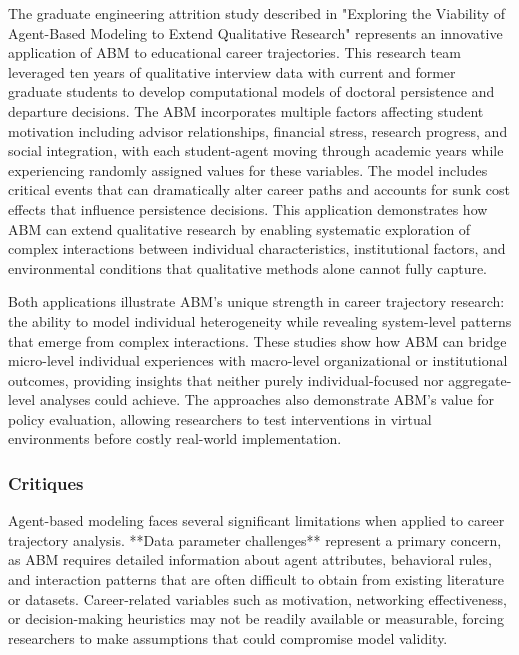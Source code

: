 \documentclass[main.tex]{subfiles}
\begin{document}
The graduate engineering attrition study described in "Exploring the Viability of Agent-Based Modeling to Extend Qualitative Research" represents an innovative application of ABM to educational career trajectories\parencite{graduate_attrition}. This research team leveraged ten years of qualitative interview data with current and former graduate students to develop computational models of doctoral persistence and departure decisions. The ABM incorporates multiple factors affecting student motivation including advisor relationships, financial stress, research progress, and social integration, with each student-agent moving through academic years while experiencing randomly assigned values for these variables. The model includes critical events that can dramatically alter career paths and accounts for sunk cost effects that influence persistence decisions. This application demonstrates how ABM can extend qualitative research by enabling systematic exploration of complex interactions between individual characteristics, institutional factors, and environmental conditions that qualitative methods alone cannot fully capture.

Both applications illustrate ABM's unique strength in career trajectory research: the ability to model individual heterogeneity while revealing system-level patterns that emerge from complex interactions. These studies show how ABM can bridge micro-level individual experiences with macro-level organizational or institutional outcomes, providing insights that neither purely individual-focused nor aggregate-level analyses could achieve. The approaches also demonstrate ABM's value for policy evaluation, allowing researchers to test interventions in virtual environments before costly real-world implementation.

\subsubsection{Critiques}

Agent-based modeling faces several significant limitations when applied to career trajectory analysis. **Data parameter challenges** represent a primary concern, as ABM requires detailed information about agent attributes, behavioral rules, and interaction patterns that are often difficult to obtain from existing literature or datasets\parencite{columbia_abm}. Career-related variables such as motivation, networking effectiveness, or decision-making heuristics may not be readily available or measurable, forcing researchers to make assumptions that could compromise model validity.
\end{document}
